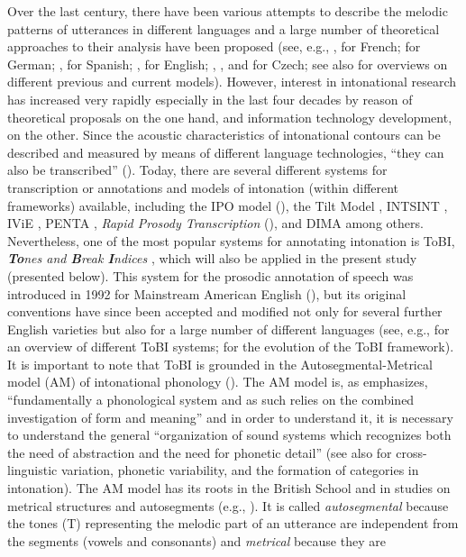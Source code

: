 Over the last century, there have been various attempts to describe the melodic patterns of utterances in different languages and a large number of theoretical approaches to their analysis have been proposed (see, e.g., \citealt{PassyRambaud1897}, \citealt{Delattre1966} for French; \citealt{Klinghardt1923} for German;  \citealt{NavarroTomás1948}, \citealt{Quilis1975} for Spanish; \citealt{Pike1945}, \citealt{Bolinger1951,Bolinger1972a} for English; \citealt{Petřík1935a, Petřík1935b}, \citealt{Mathesius1937}, and \citealt{Daneš1957,Daneš1985} for Czech; see also \citealt{Prieto2003, Ladd2008,Ladd2015, Elvira-GarcíaEtAl2016, GiliFivelaEtAl2015, NiebuhrWard2018} for overviews on different previous and current models). However, interest in intonational research has increased very rapidly especially in the last four decades by reason of theoretical proposals on the one hand, and information technology development, on the other. Since the acoustic characteristics of intonational contours can be described and measured by means of different language technologies, “they can also be transcribed” (\citealt[768]{Elvira-GarcíaEtAl2016}). Today, there are several different systems for transcription or annotations and models of intonation (within different frameworks) available, including the IPO model (\citealt{HartEtAl1990}), the Tilt Model \citep{Taylor2000}, INTSINT \citep{HirstEtAl2000}, IViE \citep{Grabe2001}, PENTA \citep{Xu2005}, \textit{Rapid Prosody Transcription} (\citealt{ColeShattuck-Hufnagel2016}), and DIMA \citep{KüglerEtAl2015} among others. Nevertheless, one of the most popular systems for annotating intonation is ToBI, \textit{\textbf{To}nes and \textbf{B}reak \textbf{I}ndices} \citep[155]{Hualde2003}, which will also be applied in the present study (presented below). This system for the prosodic annotation of speech was introduced in 1992 for Mainstream American English (\citealt{SilvermanEtAl1992, BeckmanHirschberg1994, BeckmanEtAl2005}), but its original conventions have since been accepted and modified not only for several further English varieties but also for a large number of different languages (see, e.g., \citealt{Jun2005,Jun2014} for an overview of different ToBI systems; \citealt{BeckmanEtAl2005} for the evolution of the ToBI framework). It is important to note that ToBI is grounded in the Autosegmental-Metrical model (AM) of intonational phonology (\citealt{Pierrehumbert1980, Ladd1996}). The AM model is, as \citet[52]{Arvaniti2022} emphasizes, “fundamentally a phonological system and as such relies on the combined investigation of form and meaning” and in order to understand it, it is necessary to understand the general “organization of sound systems which recognizes both the need of abstraction and the need for phonetic detail” (see also \citealt{Arvaniti2019} for cross-linguistic variation, phonetic variability, and the formation of categories in intonation). The AM model has its roots in the British School and in studies on metrical structures and autosegments (e.g., \citealt{OConnorArnold1961, Bolinger1957, Liberman1975, Goldsmith1976, Selkirk1980}). It is called \textit{autosegmental} because the tones (T) representing the melodic part of an utterance are independent from the segments (vowels and consonants) and \textit{metrical} because they are 